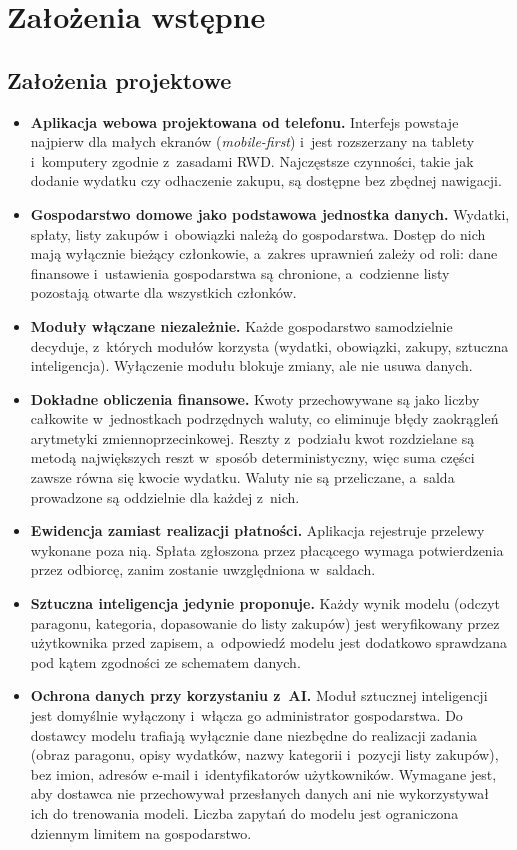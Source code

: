 \section{Założenia wstępne}

\subsection{Założenia projektowe}

\begin{itemize}
  \item \textbf{Aplikacja webowa projektowana od telefonu.} Interfejs powstaje najpierw dla małych ekranów (\emph{mobile-first}) i~jest rozszerzany na tablety i~komputery zgodnie z~zasadami RWD. Najczęstsze czynności, takie jak dodanie wydatku czy odhaczenie zakupu, są dostępne bez zbędnej nawigacji.
  \item \textbf{Gospodarstwo domowe jako podstawowa jednostka danych.} Wydatki, spłaty, listy zakupów i~obowiązki należą do gospodarstwa. Dostęp do nich mają wyłącznie bieżący członkowie, a~zakres uprawnień zależy od roli: dane finansowe i~ustawienia gospodarstwa są chronione, a~codzienne listy pozostają otwarte dla wszystkich członków.
  \item \textbf{Moduły włączane niezależnie.} Każde gospodarstwo samodzielnie decyduje, z~których modułów korzysta (wydatki, obowiązki, zakupy, sztuczna inteligencja). Wyłączenie modułu blokuje zmiany, ale nie usuwa danych.
  \item \textbf{Dokładne obliczenia finansowe.} Kwoty przechowywane są jako liczby całkowite w~jednostkach podrzędnych waluty, co eliminuje błędy zaokrągleń arytmetyki zmiennoprzecinkowej. Reszty z~podziału kwot rozdzielane są metodą największych reszt w~sposób deterministyczny, więc suma części zawsze równa się kwocie wydatku. Waluty nie są przeliczane, a~salda prowadzone są oddzielnie dla każdej z~nich.
  \item \textbf{Ewidencja zamiast realizacji płatności.} Aplikacja rejestruje przelewy wykonane poza nią. Spłata zgłoszona przez płacącego wymaga potwierdzenia przez odbiorcę, zanim zostanie uwzględniona w~saldach.
  \item \textbf{Sztuczna inteligencja jedynie proponuje.} Każdy wynik modelu (odczyt paragonu, kategoria, dopasowanie do listy zakupów) jest weryfikowany przez użytkownika przed zapisem, a~odpowiedź modelu jest dodatkowo sprawdzana pod kątem zgodności ze schematem danych.
  \item \textbf{Ochrona danych przy korzystaniu z~AI.} Moduł sztucznej inteligencji jest domyślnie wyłączony i~włącza go administrator gospodarstwa. Do dostawcy modelu trafiają wyłącznie dane niezbędne do realizacji zadania (obraz paragonu, opisy wydatków, nazwy kategorii i~pozycji listy zakupów), bez imion, adresów e-mail i~identyfikatorów użytkowników. Wymagane jest, aby dostawca nie przechowywał przesłanych danych ani nie wykorzystywał ich do trenowania modeli. Liczba zapytań do modelu jest ograniczona dziennym limitem na gospodarstwo.

\end{itemize}
